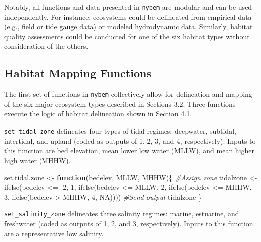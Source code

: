 \documentclass[
]{book}
\newenvironment{Shaded}{\begin{snugshade}}{\end{snugshade}}
\newcommand{\CommentTok}[1]{\textcolor[rgb]{0.56,0.35,0.01}{\textit{#1}}}
\newcommand{\ConstantTok}[1]{\textcolor[rgb]{0.00,0.00,0.00}{#1}}
\newcommand{\ControlFlowTok}[1]{\textcolor[rgb]{0.13,0.29,0.53}{\textbf{#1}}}
\newcommand{\DecValTok}[1]{\textcolor[rgb]{0.00,0.00,0.81}{#1}}
\newcommand{\FunctionTok}[1]{\textcolor[rgb]{0.00,0.00,0.00}{#1}}
\newcommand{\NormalTok}[1]{#1}
\newcommand{\OtherTok}[1]{\textcolor[rgb]{0.56,0.35,0.01}{#1}}
\newcommand{\SpecialCharTok}[1]{\textcolor[rgb]{0.00,0.00,0.00}{#1}}
\begin{document}
Notably, all functions and data presented in \texttt{nybem} are modular and can be used independently. For instance, ecosystems could be delineated from empirical data (e.g., field or tide gauge data) or modeled hydrodynamic data. Similarly, habitat quality assessments could be conducted for one of the six habitat types without consideration of the others.

\hypertarget{habitat-mapping-functions}{%
\subsection{Habitat Mapping Functions}\label{habitat-mapping-functions}}

The first set of functions in \texttt{nybem} collectively allow for delineation and mapping of the six major ecosystem types described in Sections 3.2. Three functions execute the logic of habitat delineation shown in Section 4.1.

\texttt{set\_tidal\_zone} delineates four types of tidal regimes: deepwater, subtidal, intertidal, and upland (coded as outputs of 1, 2, 3, and 4, respectively). Inputs to this function are bed elevation, mean lower low water (MLLW), and mean higher high water (MHHW).

\begin{Shaded}
\begin{Highlighting}[]
\NormalTok{set.tidal.zone }\OtherTok{\textless{}{-}} \ControlFlowTok{function}\NormalTok{(bedelev, MLLW, MHHW)\{}
  \CommentTok{\#Assign zone}
\NormalTok{  tidalzone }\OtherTok{\textless{}{-}} \FunctionTok{ifelse}\NormalTok{(bedelev }\SpecialCharTok{\textless{}=} \SpecialCharTok{{-}}\DecValTok{2}\NormalTok{, }\DecValTok{1}\NormalTok{,}
          \FunctionTok{ifelse}\NormalTok{(bedelev }\SpecialCharTok{\textless{}=}\NormalTok{ MLLW, }\DecValTok{2}\NormalTok{,}
          \FunctionTok{ifelse}\NormalTok{(bedelev }\SpecialCharTok{\textless{}=}\NormalTok{ MHHW, }\DecValTok{3}\NormalTok{, }
          \FunctionTok{ifelse}\NormalTok{(bedelev }\SpecialCharTok{\textgreater{}}\NormalTok{ MHHW, }\DecValTok{4}\NormalTok{, }\ConstantTok{NA}\NormalTok{))))}
  \CommentTok{\#Send output}
\NormalTok{  tidalzone}
\NormalTok{\}}
\end{Highlighting}
\end{Shaded}

\texttt{set\_salinity\_zone} delineates three salinity regimes: marine, estuarine, and freshwater (coded as outputs of 1, 2, and 3, respectively). Inputs to this function are a representative low salinity.
\end{document}
